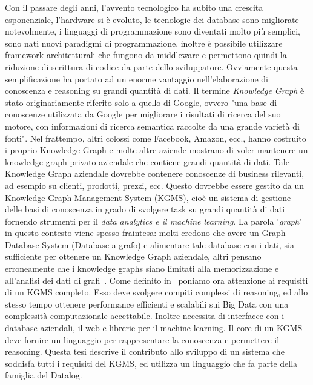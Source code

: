 Con il passare degli anni, l'avvento tecnologico ha subito una crescita esponenziale, l'hardware si è evoluto, le tecnologie dei database sono migliorate notevolmente, i linguaggi di programmazione sono diventati molto più semplici, sono nati nuovi paradigmi di programmazione, inoltre è possibile utilizzare framework architetturali che fungono da middleware e permettono quindi la riduzione di scrittura di codice da parte dello sviluppatore. Ovviamente questa semplificazione ha portato ad un enorme vantaggio nell'elaborazione di conoscenza e reasoning su grandi quantità di dati. \newline
Il termine \emph{Knowledge Graph} è stato originariamente riferito solo a quello di Google, ovvero "una base di conoscenze utilizzata da Google per migliorare i risultati di ricerca del suo motore, con informazioni di ricerca semantica raccolte da una grande varietà di fonti". Nel frattempo, altri colossi come Facebook, Amazon, ecc., hanno costruito i proprio Knowledge Graph e molte altre aziende mostrano di voler mantenere un knowledge graph privato aziendale che contiene grandi quantità di dati. Tale Knowledge Graph aziendale dovrebbe contenere conoscenze di business rilevanti, ad esempio su clienti, prodotti, prezzi, ecc. Questo dovrebbe essere gestito da un Knowledge Graph Management System (KGMS), cioè un sistema di gestione delle basi di conoscenza in grado di svolgere task su grandi quantità di dati fornendo strumenti per il \emph{data analytics e il machine learning}. La parola '\textit{graph}' in questo contesto viene spesso fraintesa: molti credono che avere un Graph Database System (Database a grafo) e alimentare tale database con i dati, sia sufficiente per ottenere un Knowledge Graph aziendale, altri pensano erroneamente che i knowledge graphs siano limitati alla memorizzazione e all'analisi dei dati di grafi~\cite{bellomarini2017swift}. \newline
Come definito in~\cite{bellomarini2017swift} poniamo ora attenzione ai requisiti di un KGMS completo. Esso deve svolgere compiti complessi di reasoning, ed allo stesso tempo ottenere performance efficienti e scalabili sui Big Data con una complessit\`a computazionale accettabile. Inoltre necessita di interfacce con i database aziendali, il web e librerie per il machine learning. Il core di un KGMS deve fornire un linguaggio per rappresentare la conoscenza e permettere il reasoning.\newline \newline
Questa tesi descrive il contributo allo sviluppo di un sistema che soddisfa tutti i requisiti del KGMS, ed utilizza un linguaggio che fa parte della famiglia del Datalog. \newline
